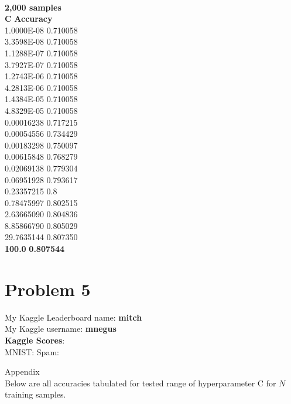 \documentclass{report}
\newcommand{\tab}{\-\hspace{1.5cm}}
\begin{document}
\-\\
\textbf{2,000 samples}\\
\textbf{C} \tab\tab \textbf{Accuracy}\\
1.0000E-08 \tab 0.710058\\
3.3598E-08 \tab 0.710058\\
1.1288E-07 \tab 0.710058\\
3.7927E-07 \tab 0.710058\\
1.2743E-06 \tab 0.710058\\
4.2813E-06 \tab 0.710058\\
1.4384E-05 \tab 0.710058\\
4.8329E-05 \tab 0.710058\\
0.00016238 \tab 0.717215\\
0.00054556 \tab 0.734429\\
0.00183298 \tab 0.750097\\
0.00615848 \tab 0.768279\\
0.02069138 \tab 0.779304\\
0.06951928 \tab 0.793617\\
0.23357215 \tab 0.8\\
0.78475997 \tab 0.802515\\
2.63665090 \tab 0.804836\\
8.85866790 \tab 0.805029\\
29.7635144 \tab 0.807350\\
\textbf{100.0} \hspace{0.7cm}\tab \textbf{0.807544}


\section*{Problem 5}

My Kaggle Leaderboard name: \textbf{mitch}\\
My Kaggle username: \textbf{mnegus}\\

\textbf{Kaggle Scores}:\\
MNIST: \tab\tab Spam: \\


\appendix

\huge{Appendix}\normalsize\\

Below are all accuracies tabulated for tested range of hyperparameter C for $N$ training samples.\\
\end{document}
